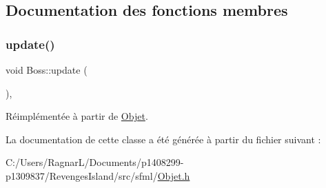 \subsection{Documentation des fonctions membres}
\mbox{\label{class_boss_ab3b0e756ba923f88c8afea3ed3af552c}} 
\subsubsection{\texorpdfstring{update()}{update()}}
{\footnotesize\ttfamily void Boss\+::update (\begin{DoxyParamCaption}{ }\end{DoxyParamCaption})\hspace{0.3cm}{\ttfamily [inline]}, {\ttfamily [virtual]}}



Réimplémentée à partir de \hyperlink{class_objet_a684611b20eb6e6df5e4743dd3e42385a}{Objet}.



La documentation de cette classe a été générée à partir du fichier suivant \+:\begin{DoxyCompactItemize}
\item 
C\+:/\+Users/\+Ragnar\+L/\+Documents/p1408299-\/p1309837/\+Revenges\+Island/src/sfml/\hyperlink{_objet_8h}{Objet.\+h}\end{DoxyCompactItemize}
